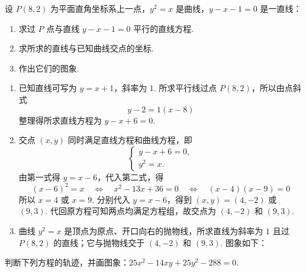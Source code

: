 \begin{problem}
设 \(P\left( 8,2 \right)\) 为平面直角坐标系上一点，\(y^2=x\) 是曲线，\(y-x-1=0\) 是一直线：

\begin{enumerate}
    \item 求过 \(P\) 点与直线 \(y-x-1=0\) 平行的直线方程.
    \item 求所求的直线与已知曲线交点的坐标.
    \item 作出它们的图象.
\end{enumerate}
\end{problem}

\begin{solution}
\begin{enumerate}
\item 已知直线可写为 \(y=x+1\)，斜率为 \(1\). 所求平行线过点 \(P\left(8,2\right)\)，所以由点斜式
\[
y-2=1\left(x-8\right)
\]
整理得所求直线方程为 \(y-x+6=0\).

\item 交点 \((x,y)\) 同时满足直线方程和曲线方程，即
\[
\begin{cases}
y-x+6=0,\\
y^2=x.
\end{cases}
\]
由第一式得 \(y=x-6\)，代入第二式，得
\[
(x-6)^2=x\quad\Longleftrightarrow\quad x^2-13x+36=0
\quad\Longleftrightarrow\quad (x-4)(x-9)=0
\]
所以 \(x=4\) 或 \(x=9\). 分别代入 \(y=x-6\)，得到 \((x,y)=\left(4,-2\right)\) 或 \(\left(9,3\right)\). 代回原方程可知两点均满足方程组，故交点为 \(\left(4,-2\right)\) 和 \(\left(9,3\right)\).

\item 曲线 \(y^2=x\) 是顶点为原点、开口向右的抛物线，所求直线为斜率为 \(1\) 且过 \(P\left(8,2\right)\) 的直线；它与抛物线交于 \(\left(4,-2\right)\) 和 \(\left(9,3\right)\). 图象如下：

\end{enumerate}
\end{solution}

\begin{problem}
判断下列方程的轨迹，并画图象：\(25x^2-14xy+25y^2-288=0\).
\end{problem}

